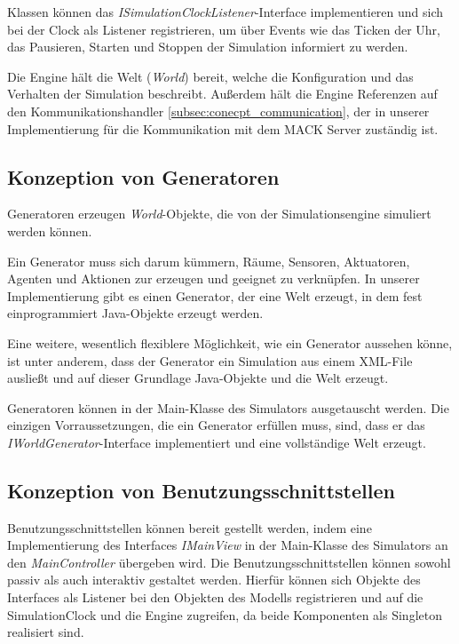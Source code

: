 Klassen können das \emph{ISimulationClockListener}-Interface implementieren und sich bei der Clock als Listener registrieren, um über Events wie das Ticken der Uhr, das Pausieren, Starten und Stoppen der Simulation informiert zu werden.

Die Engine hält die Welt (\emph{World}) bereit, welche die Konfiguration und das Verhalten der Simulation beschreibt. Außerdem hält die Engine Referenzen auf den Kommunikationshandler \ref{subsec:conecpt_communication}, der in unserer Implementierung für die Kommunikation mit dem MACK Server zuständig ist.

\subsection{Konzeption von Generatoren}\label{subsec:concept_generators}
Generatoren erzeugen \emph{World}-Objekte, die von der Simulationsengine simuliert werden können.

Ein Generator muss sich darum kümmern, Räume, Sensoren, Aktuatoren, Agenten und Aktionen zur erzeugen und geeignet zu verknüpfen. In unserer Implementierung gibt es einen Generator, der eine Welt erzeugt, in dem fest einprogrammiert Java-Objekte erzeugt werden.

Eine weitere, wesentlich flexiblere Möglichkeit, wie ein Generator aussehen könne, ist unter anderem, dass der Generator ein Simulation aus einem XML-File ausließt und auf dieser Grundlage Java-Objekte und die Welt erzeugt.

Generatoren können in der Main-Klasse des Simulators ausgetauscht werden. Die einzigen Vorraussetzungen, die ein Generator erfüllen muss, sind, dass er das \emph{IWorldGenerator}-Interface implementiert und eine vollständige Welt erzeugt.


\subsection{Konzeption von Benutzungsschnittstellen}\label{subsec:concept_interfaces}
Benutzungsschnittstellen können bereit gestellt werden, indem eine Implementierung des Interfaces \emph{IMainView} in der Main-Klasse des Simulators an den \emph{MainController} übergeben wird. Die Benutzungsschnittstellen können sowohl passiv als auch interaktiv gestaltet werden. Hierfür können sich Objekte des Interfaces als Listener bei den Objekten des Modells registrieren und auf die SimulationClock und die Engine zugreifen, da beide Komponenten als Singleton realisiert sind.

